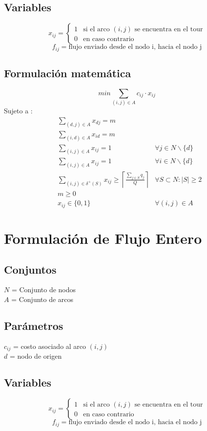 \documentclass{article}
\numberwithin{equation}{section}
\begin{document}
\subsection{Variables}
\begin{flushleft}
\[x_{ij}={\begin{cases}1&{\mbox{si el arco $(i,j)$ se encuentra en el tour}}\\0&{\mbox{en caso contrario}}\end{cases}}
\]
\[f_{ij} = \mbox{flujo enviado desde el nodo i, hacia el nodo j}\]
\end{flushleft}
\subsection{Formulación matemática}
\begin{equation}
min \sum_{(i,j) \in A} c_{ij} \cdot x_{ij}
\end{equation}
Sujeto a : \begin{align}
& \sum_{(d,j) \in A} x_{dj} = m \\
& \sum_{(i,d) \in A} x_{id} = m \\
& \sum_{(i,j) \in A} x_{ij} = 1 &\forall j \in N\backslash \{d\} \\
& \sum_{(i,j) \in A} x_{ij} = 1 &\forall i \in N\backslash \{d\} \\
& \sum_{(i,j) \in \delta^{+}(S)} x_{ij} \geq \left\lceil \frac{\sum\limits_{j \in S} q_{j}}{Q} \right\rceil &\forall S \subset N : |S| \geq 2 \\
& m \geq 0\\
& x_{ij} \in \{0,1\} &\forall (i,j) \in A
\end{align}


\newpage
\section{Formulación de Flujo Entero}
\subsection{Conjuntos}
$N$ = Conjunto de nodos\\
$A$ = Conjunto de arcos
\subsection{Parámetros}
$c_{ij}$ = costo asociado al arco $(i,j)$\\
$d$ = nodo de origen
\subsection{Variables}
\begin{flushleft}
\[x_{ij}={\begin{cases}1&{\mbox{si el arco $(i,j)$ se encuentra en el tour}}\\0&{\mbox{en caso contrario}}\end{cases}}
\]
\[f_{ij} = \mbox{flujo enviado desde el nodo i, hacia el nodo j}\]
\end{flushleft}
\end{document}
